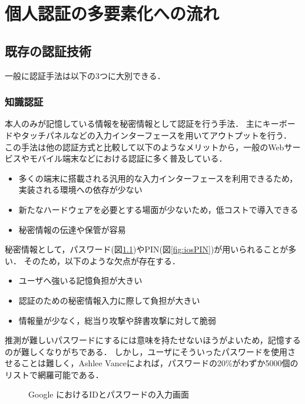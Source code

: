 \chapter{個人認証の多要素化への流れ}\label{chap:preparation}

\section{既存の認証技術}
一般に認証手法は以下の3つに大別できる．

\subsection{知識認証}\label{subsec:knowledge}
本人のみが記憶している情報を秘密情報として認証を行う手法．
主にキーボードやタッチパネルなどの入力インターフェースを用いてアウトプットを行う．
この手法は他の認証方式と比較して以下のようなメリットから，一般のWebサービスやモバイル端末などにおける認証に多く普及している．
\begin{itemize}
\item 多くの端末に搭載される汎用的な入力インターフェースを利用できるため，実装される環境への依存が少ない
\item 新たなハードウェアを必要とする場面が少ないため，低コストで導入できる
\item 秘密情報の伝達や保管が容易
\end{itemize}
秘密情報として，パスワード(図\ref{fig:loginGoogleWithIDAndPass})やPIN(図\ref{fig:iosPIN})が用いられることが多い．
そのため，以下のような欠点が存在する．
\begin{itemize}
\item ユーザへ強いる記憶負担が大きい
\item 認証のための秘密情報入力に際して負担が大きい
\item 情報量が少なく，総当り攻撃や辞書攻撃に対して脆弱
\end{itemize}
推測が難しいパスワードにするには意味を持たせないほうがよいため，記憶するのが難しくなりがちである．
しかし，ユーザにそういったパスワードを使用させることは難しく，Ashlee Vance\cite{21password}によれば，パスワードの20\%がわずか5000個のリストで網羅可能である．

\begin{figure}[th]
\begin{center}
\end{center}
\caption{Google におけるIDとパスワードの入力画面}
\label{fig:loginGoogleWithIDAndPass}
\end{figure}

